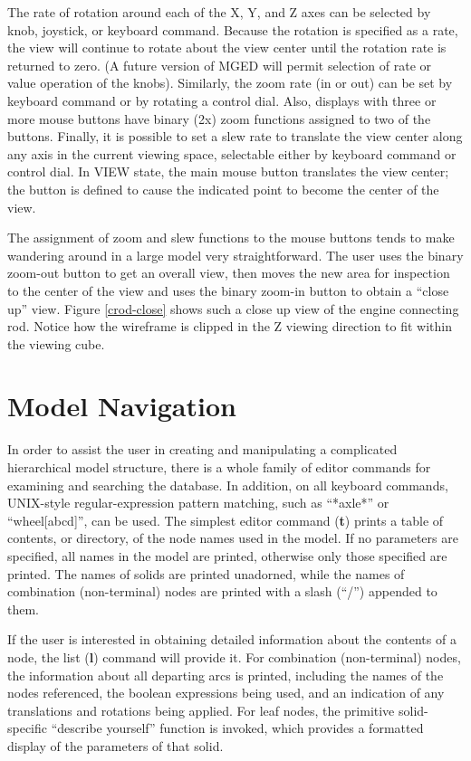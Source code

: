 The rate of rotation around each of the X, Y, and Z axes
can be selected by knob, joystick, or keyboard command.
Because the rotation is specified as a rate, the view
will continue to rotate about the view center until the rotation
rate is returned to zero.
(A future version of MGED will permit selection of rate or value
operation of the knobs).
Similarly, the zoom rate (in or out) can be set by keyboard
command or by rotating a control dial.
Also, displays with three or more mouse buttons have binary (2x) zoom
functions assigned to two of the buttons.
Finally, it is possible to set a slew rate to translate the view
center along any axis in the current viewing space, selectable
either by keyboard command or control dial.
In VIEW state, the main mouse button translates the
view center;  the button is defined to cause the indicated point to become
the center of the view.

The assignment of zoom and slew functions to the mouse buttons tends to
make wandering around in a large model very straightforward.
The user uses the binary zoom-out button to get an overall view, then
moves the new area for inspection to the center of the view and uses
the binary zoom-in button to obtain a ``close up'' view.
Figure \ref{crod-close}
shows such a close up view of the engine connecting rod.
Notice how the wireframe is clipped in the Z viewing direction
to fit within the viewing cube.

\section{Model Navigation}

In order to assist the user in creating and manipulating a complicated
hierarchical model structure, there is a whole family of editor commands
for examining and searching the database.
In addition, on all keyboard commands, UNIX-style regular-expression
pattern matching, such as ``*axle*'' or ``wheel[abcd]'', can be used.
The simplest editor command ({\bf t}) prints a table of contents, or directory,
of the node names used in the model.  If no parameters are specified,
all names in the model are printed,
otherwise only those specified are printed.
The names of solids are printed unadorned, while the names of combination
(non-terminal) nodes are printed with a slash (``/'') appended to them.

If the user is interested in obtaining detailed information about the
contents of a node, the list ({\bf l}) command will provide it.
For combination (non-terminal) nodes, the information about all departing
arcs is printed, including the names of the nodes referenced, the boolean
expressions being used, and an indication of any translations and rotations
being applied.
For leaf nodes, the primitive solid-specific ``describe yourself''
function is invoked, which provides a formatted display of the parameters
of that solid.

